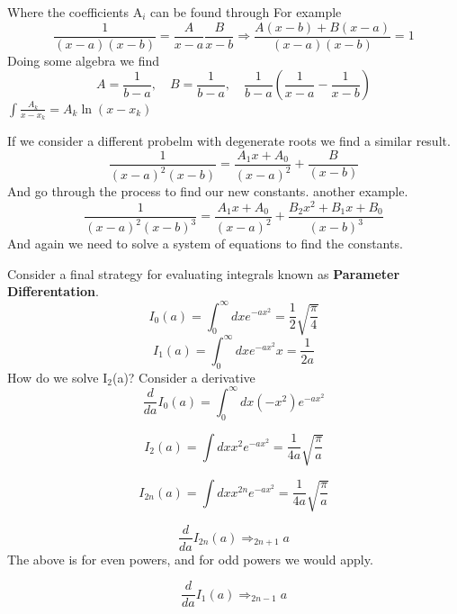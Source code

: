 \documentclass{article}
\newcommand{\be}{\begin{equation}}
\newcommand{\ee}{\end{equation}}
\begin{document}
Where the coefficients A$_i$ can be found through%
For example
\be
\frac{1}{(x-a)(x-b)} = \frac{A}{x-a} \frac{B}{x-b} \Rightarrow \frac{A(x-b) + B(x-a)}{(x-a)(x-b)} = 1
\ee
Doing some algebra we find
\be
A = \frac{1}{b-a}, \quad B = \frac{1}{b-a}, \quad \frac{1}{b-a} \left(\frac{1}{x-a} - \frac{1}{x-b}\right)
\ee
$\int \frac{A_k}{x-x_k} = A_k \ln(x-x_k)$

If we consider a different probelm with degenerate roots we find a similar result.
\be
\frac{1}{(x-a)^2(x-b)} = \frac{A_1x + A_0}{(x-a)^2} + \frac{B}{(x-b)}
\ee
And go through the process to find our new constants. another example.
\be
\frac{1}{(x-a)^2(x-b)^3} = \frac{A_1x + A_0}{(x-a)^2} + \frac{B_2x^2 + B_1x + B_0}{(x-b)^3}
\ee
And again we need to solve a system of equations to find the constants.

Consider a final strategy for evaluating integrals known as \textbf{Parameter Differentation}.
\be
I_0(a) = \int_0^\infty dx e^{-ax^2} = \frac{1}{2} \sqrt{\frac{\pi}{4}}
\ee
\be
I_1(a) = \int_0^\infty dx e^{-ax^2}x = \frac{1}{2a}
\ee
How do we solve I$_2$(a)?
Consider a derivative
\be
\frac{d}{da} I_0(a) = \int_0^\infty dx (-x^2) e^{-ax^2}
\ee

\be
I_2(a) = \int dx x^2e^{-ax^2} = \frac{1}{4a} \sqrt{\frac{\pi}{a}}
\ee

\be
I_{2n}(a) = \int dx x^{2n}e^{-ax^2} = \frac{1}{4a} \sqrt{\frac{\pi}{a}}
\ee

\be
\frac{d}{da} I_{2n}(a) \Rightarrow _{2n+1} a
\ee
The above is for even powers, and for odd powers we would apply.

\be
\frac{d}{da} I_1(a) \Rightarrow _{2n-1} a
\ee
\end{document}
